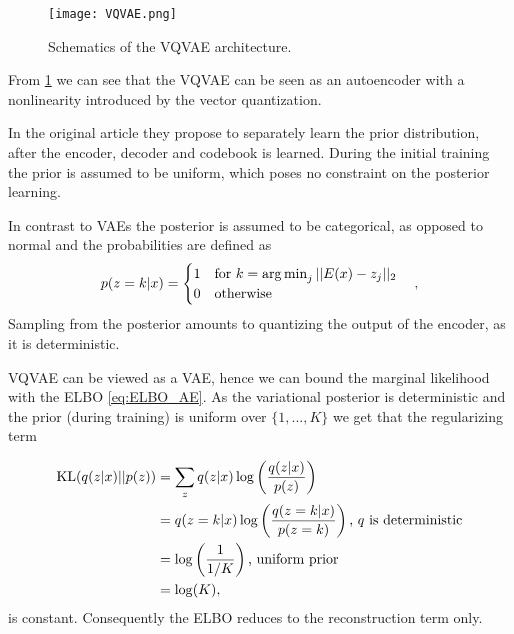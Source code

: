 \documentclass[../../thesis.tex]{subfiles}
\begin{document}
\begin{figure}[h]
    \texttt{[image: VQVAE.png]}
    \centering
    \caption{Schematics of the VQVAE architecture.}
    \label{fig:VQVAE}
\end{figure}
From \ref{fig:VQVAE} we can see that the VQVAE can be seen as an autoencoder with a nonlinearity introduced by the vector quantization. \newline

In the original article \cite{VQVAE} they propose to separately learn the prior distribution, after the encoder, decoder and codebook is learned. During the initial training the prior is assumed to be uniform, which poses no constraint on the posterior learning. \newline

In contrast to VAEs the posterior is assumed to be categorical, as opposed to normal and the probabilities are defined as
\begin{equation}
    p(z=k | x) = 
    \begin{cases} 
        1 \quad \text{for }k = \operatorname*{arg\,min}_j||E(x) - z_j||_2 \\
        0 \quad \text{otherwise}
    \end{cases},
\end{equation}
Sampling from the posterior amounts to quantizing the output of the encoder, as it is deterministic. \newline

VQVAE can be viewed as a VAE, hence we can bound the marginal likelihood with the ELBO \ref{eq:ELBO_AE}. As the variational posterior is deterministic and the prior (during training) is uniform over $\{1,...,K\}$ we get that the regularizing term

\begin{equation}
    \begin{aligned}
        \operatorname*{\mathrm{KL}}(q(z|x)||p(z)) &= \sum_{z}  q(z|x) \log \left(\frac{q(z|x)}{p(z)}\right) \\
                           &= q(z=k|x) \log \left(\frac{q(z=k|x)}{p(z=k)}\right) \text{, $q$ is deterministic}\\
                           &= \log \left(\frac{1}{1/K}\right) \text{, uniform prior}\\
                           &= \log(K), 
    \end{aligned}
\end{equation}
is constant. Consequently the ELBO reduces to the reconstruction term only. \newline
\end{document}

